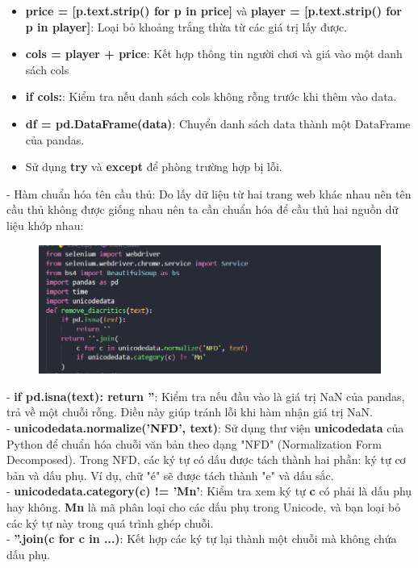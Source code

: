 \documentclass[12pt, letterpaper]{article}
\begin{document}
\begin{itemize}
\begin{itemize}[label=$\circ$]
    \end{itemize}
    \item \textbf{price = [p.text.strip() for p in price]} và \textbf{player = [p.text.strip() for p in player]}: Loại bỏ khoảng trắng thừa từ các giá trị lấy được.
    \item \textbf{cols = player + price}: Kết hợp thông tin người chơi và giá vào một danh sách cols
    \item \textbf{if cols:}: Kiểm tra nếu danh sách cols không rỗng trước khi thêm vào data.
    \item \textbf{df = pd.DataFrame(data)}: Chuyển danh sách data thành một DataFrame của pandas.
    \item Sử dụng \textbf{try} và \textbf{except} để phòng trường hợp bị lỗi.
\end{itemize}
- Hàm chuẩn hóa tên cầu thủ: Do lấy dữ liệu từ hai trang web khác nhau nên tên cầu thủ không được giống nhau nên ta cần chuẩn hóa để cầu thủ hai nguồn dữ liệu khớp nhau:
\begin{figure}[H]
    \centering
    \includegraphics[width=1\linewidth]{img/4-1_2.png}
\end{figure}
- \textbf{if pd.isna(text): return ''}: Kiểm tra nếu đầu vào là giá trị NaN của pandas, trả về một chuỗi rỗng. Điều này giúp tránh lỗi khi hàm nhận giá trị NaN.\\
- \textbf{unicodedata.normalize('NFD', text)}: Sử dụng thư viện \textbf{unicodedata} của Python để chuẩn hóa chuỗi văn bản theo dạng "NFD" (Normalization Form Decomposed). Trong NFD, các ký tự có dấu được tách thành hai phần: ký tự cơ bản và dấu phụ. Ví dụ, chữ "é" sẽ được tách thành "e" và dấu sắc.\\
- \textbf{unicodedata.category(c) != 'Mn'}: Kiểm tra xem ký tự \textbf{c} có phải là dấu phụ hay không. \textbf{Mn} là mã phân loại cho các dấu phụ trong Unicode, và bạn loại bỏ các ký tự này trong quá trình ghép chuỗi.\\
- \textbf{''.join(c for c in ...)}: Kết hợp các ký tự lại thành một chuỗi mà không chứa dấu phụ.
\end{document}
